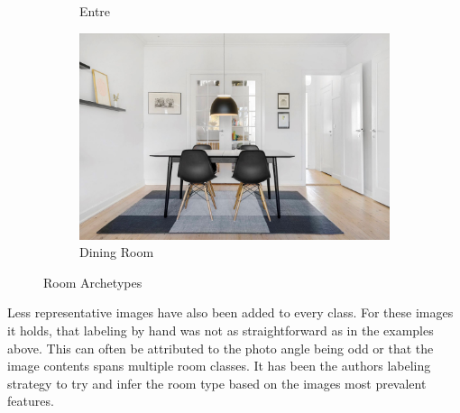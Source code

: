 \begin{figure}[H]
\begin{subfigure}{0.3\textwidth}
    \caption{Entre}
  \end{subfigure}\hfil %
  \begin{subfigure}{0.3\textwidth}
    \includegraphics[width=\linewidth]{pictures/random/example_diningroom}
    \caption{Dining Room}
  \end{subfigure}
  \caption{Room Archetypes}
  \label{fig:appb1}
\end{figure}

Less representative images have also been added to every class. For these images it holds, that labeling by hand was not as straightforward as in the examples above. 
This can often be attributed to the photo angle being odd or that the image contents spans multiple room classes. 
It has been the authors labeling strategy to try and infer the room type based on the images most prevalent features.

